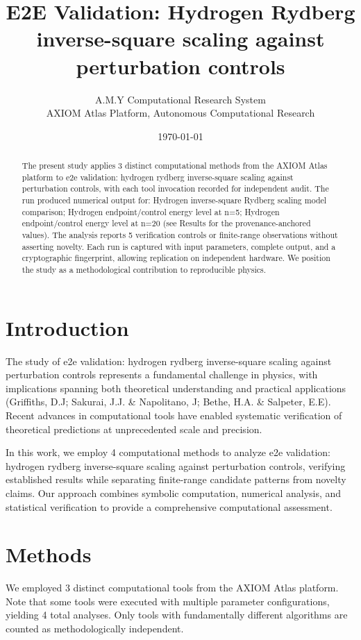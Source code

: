 \documentclass[11pt,a4paper]{article}
\title{E2E Validation: Hydrogen Rydberg inverse-square scaling against perturbation controls}
\author{A.M.Y Computational Research System\\
\small AXIOM Atlas Platform, Autonomous Computational Research}
\date{\today}
\begin{document}
\maketitle

\begin{abstract}
The present study applies 3 distinct computational methods from the AXIOM Atlas platform to e2e validation: hydrogen rydberg inverse-square scaling against perturbation controls, with each tool invocation recorded for independent audit. The run produced numerical output for: Hydrogen inverse-square Rydberg scaling model comparison; Hydrogen endpoint/control energy level at n=5; Hydrogen endpoint/control energy level at n=20 (see Results for the provenance-anchored values). The analysis reports 5 verification controls or finite-range observations without asserting novelty. Each run is captured with input parameters, complete output, and a cryptographic fingerprint, allowing replication on independent hardware. We position the study as a methodological contribution to reproducible physics.
\end{abstract}

\section{Introduction}
The study of e2e validation: hydrogen rydberg inverse-square scaling against perturbation controls represents a fundamental challenge in physics, with implications spanning both theoretical understanding and practical applications (Griffiths, D.J; Sakurai, J.J. \& Napolitano, J; Bethe, H.A. \& Salpeter, E.E). Recent advances in computational tools have enabled systematic verification of theoretical predictions at unprecedented scale and precision.

In this work, we employ 4 computational methods to analyze e2e validation: hydrogen rydberg inverse-square scaling against perturbation controls, verifying established results while separating finite-range candidate patterns from novelty claims. Our approach combines symbolic computation, numerical analysis, and statistical verification to provide a comprehensive computational assessment.


\section{Methods}
We employed 3 distinct computational tools from the AXIOM Atlas platform. Note that some tools were executed with multiple parameter configurations, yielding 4 total analyses. Only tools with fundamentally different algorithms are counted as methodologically independent.
\end{document}
